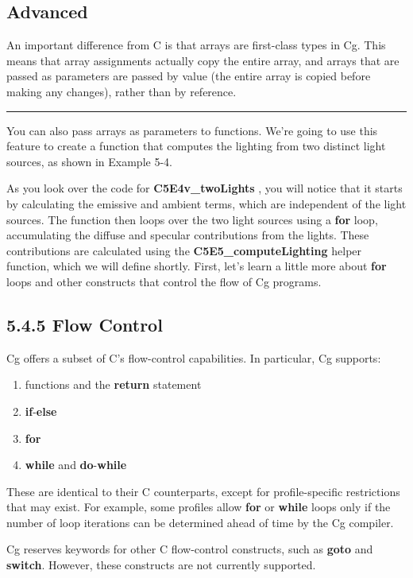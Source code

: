 \documentclass[../main.tex]{subfiles}
\begin{document}
\subsection*{Advanced}

An important difference from C is that arrays are first-class types in Cg. This means that array assignments actually copy the entire array, and arrays that are passed as parameters are passed by value (the entire array is copied before making any changes), rather than by reference.
\hrule

You can also pass arrays as parameters to functions. We're going to use this feature to create a function that computes the lighting from two distinct light sources, as shown in Example 5-4.

As you look over the code for \textbf{C5E4v_twoLights} , you will notice that it starts by calculating the emissive and ambient terms, which are independent of the light sources. The function then loops over the two light sources using a \textbf{for} loop, accumulating the diffuse and specular contributions from the lights. These contributions are calculated using the \textbf{C5E5_computeLighting} helper function, which we will define shortly. First, let's learn a little more about \textbf{for} loops and other constructs that control the flow of Cg programs.

\subsection{5.4.5 Flow Control}

Cg offers a subset of C's flow-control capabilities. In particular, Cg supports:

\begin{enumerate}
\item functions and the \textbf{return} statement
\item \textbf{if}-\textbf{else}
\item \textbf{for}
\item \textbf{while} and \textbf{do}-\textbf{while}
\end{enumerate}

These are identical to their C counterparts, except for profile-specific restrictions that may exist. For example, some profiles allow \textbf{for} or \textbf{while} loops only if the number of loop iterations can be determined ahead of time by the Cg compiler.

Cg reserves keywords for other C flow-control constructs, such as \textbf{goto} and \textbf{switch}. However, these constructs are not currently supported.
\end{document}
